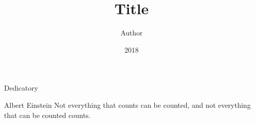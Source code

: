 \documentclass[pt,oneside,onehalfspacing,msc]{risethesis}
\title{Title}
\date{2018}
\author{Author}
\begin{document}
\frontmatter

\frontpage

\begin{fichacatalografica}
	\FakeFichaCatalografica %
\end{fichacatalografica}

\presentationpage

\banca

\begin{dedicatory}
	Dedicatory
\end{dedicatory}

\acknowledgements


\begin{epigraph}[]{Albert Einstein}
Not everything that counts can be counted, and not everything that can be counted counts.
\end{epigraph}

\resumo


\abstract


\listoffigures

\listoftables

\listofalgorithms

\listofacronyms


\tableofcontents

\mainmatter







\begin{references}
  
\end{references}


%
\end{document}
